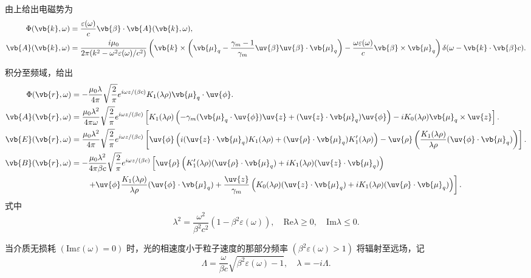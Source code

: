 \begin{example}
	由上给出电磁势为
	\begin{align*}
		\Phi(\vb{k}, \omega) &= \frac{\varepsilon(\omega)}{c} \vb{\beta} \cdot \vb{A}(\vb{k}, \omega), \\
		\vb{A}(\vb{k}, \omega) &= \frac{i \mu_{0}}{2\pi (k^{2} - \omega^{2} \varepsilon(\omega)/c^{2})} \left( \vb{k} \times \left( \vb{\mu}_{q} - \frac{\gamma_{m} - 1}{\gamma_{m}} \uv{\beta} \uv{\beta} \cdot \vb{\mu}_{q} \right) - \frac{\omega \varepsilon(\omega)}{c} \vb{\beta} \times \vb{\mu}_{q} \right) \delta(\omega - \vb{k} \cdot \vb{\beta} c).
	\end{align*}

	积分至频域，给出
	\begin{align*}
		\Phi(\vb{r}, \omega) &= -\frac{\mu_{0} \lambda}{4\pi} \sqrt{\frac{2}{\pi}} e^{i\omega z/(\beta c)} K_{1}(\lambda \rho) \vb{\mu}_{q} \cdot \uv{\phi}. \\
		\vb{A}(\vb{r}, \omega) &= \frac{\mu_{0} \lambda^{2}}{4\pi \omega} \sqrt{\frac{2}{\pi}} e^{i\omega z/(\beta c)} \left[ K_{1}(\lambda \rho) \left( -\gamma_{m} (\vb{\mu}_{q} \cdot \uv{\phi}) \uv{z} + (\uv{z} \cdot \vb{\mu}_{q}) \uv{\phi} \right) - i K_{0}(\lambda \rho) \vb{\mu}_{q} \times \uv{z} \right]. \\
		\vb{E}(\vb{r}, \omega) &= \frac{\mu_{0} \lambda^{2}}{4\pi} \sqrt{\frac{2}{\pi}} e^{i\omega z/(\beta c)} \left[ \uv{\phi} \left( i (\uv{z} \cdot \vb{\mu}_{q}) K_{1}(\lambda \rho) + (\uv{\rho} \cdot \vb{\mu}_{q}) K_{1}'(\lambda \rho) \right) - \uv{\rho} \left( \frac{K_{1}(\lambda \rho)}{\lambda \rho} (\uv{\phi} \cdot \vb{\mu}_{q}) \right) \right]. \\
		\vb{B}(\vb{r}, \omega) &= -\frac{\mu_{0} \lambda^{2}}{4\pi \beta c} \sqrt{\frac{2}{\pi}} e^{i\omega z/(\beta c)} \left[ \uv{\rho} \left( K_{1}'(\lambda \rho) (\uv{\rho} \cdot \vb{\mu}_{q}) + i K_{1}(\lambda \rho) (\uv{z} \cdot \vb{\mu}_{q}) \right) \right.\\&\qquad\left.+ \uv{\phi} \frac{K_{1}(\lambda \rho)}{\lambda \rho} (\uv{\phi} \cdot \vb{\mu}_{q}) + \frac{\uv{z}}{\gamma_{m}} \left( K_{0}(\lambda\rho) (\uv{z} \cdot \vb{\mu}_{q}) + i K_{1}(\lambda\rho) (\uv{\rho} \cdot \vb{\mu}_{q}) \right) \right].
	\end{align*}
	式中
	\begin{equation*}
		\lambda^{2} = \frac{\omega^{2}}{\beta^{2} c^{2}} (1 - \beta^{2} \varepsilon(\omega)), \quad \mathrm{Re} \lambda \ge 0, \quad \mathrm{Im} \lambda \le 0.
	\end{equation*}

	当介质无损耗 \((\mathrm{Im} \varepsilon(\omega) = 0)\) 时，光的相速度小于粒子速度的那部分频率 \((\beta^{2} \varepsilon(\omega) > 1)\) 将辐射至远场，记
	\begin{equation*}
		\Lambda = \frac{\omega}{\beta c} \sqrt{\beta^{2} \varepsilon(\omega) - 1}, \quad
		\lambda = -i \Lambda.
	\end{equation*}


\end{example}
